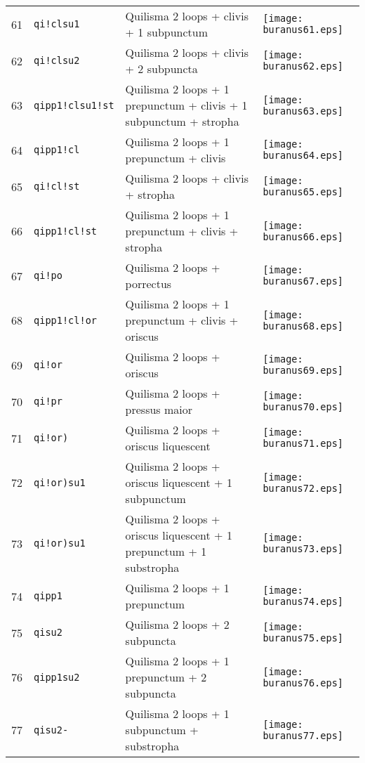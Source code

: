 \documentclass{scrarticle}
\begin{document}
\begin{longtable}{l|l|l|l}
61 & \texttt{qi!clsu1} & Quilisma 2 loops + clivis + 1 subpunctum & \texttt{[image: buranus61.eps]} \\
62 & \texttt{qi!clsu2} & Quilisma 2 loops + clivis + 2 subpuncta & \texttt{[image: buranus62.eps]} \\
63 & \texttt{qipp1!clsu1!st} & Quilisma 2 loops + 1 prepunctum + clivis + 1 subpunctum + stropha & \texttt{[image: buranus63.eps]} \\
64 & \texttt{qipp1!cl} & Quilisma 2 loops + 1 prepunctum + clivis & \texttt{[image: buranus64.eps]} \\
65 & \texttt{qi!cl!st} & Quilisma 2 loops + clivis + stropha & \texttt{[image: buranus65.eps]} \\
66 & \texttt{qipp1!cl!st} & Quilisma 2 loops + 1 prepunctum + clivis + stropha & \texttt{[image: buranus66.eps]} \\
67 & \texttt{qi!po} & Quilisma 2 loops + porrectus & \texttt{[image: buranus67.eps]} \\
68 & \texttt{qipp1!cl!or} & Quilisma 2 loops + 1 prepunctum + clivis + oriscus & \texttt{[image: buranus68.eps]} \\
69 & \texttt{qi!or} & Quilisma 2 loops + oriscus & \texttt{[image: buranus69.eps]} \\
70 & \texttt{qi!pr} & Quilisma 2 loops + pressus maior & \texttt{[image: buranus70.eps]} \\
71 & \texttt{qi!or)} & Quilisma 2 loops + oriscus liquescent & \texttt{[image: buranus71.eps]} \\
72 & \texttt{qi!or)su1} & Quilisma 2 loops + oriscus liquescent + 1 subpunctum & \texttt{[image: buranus72.eps]} \\
73 & \texttt{qi!or)su1} & Quilisma 2 loops + oriscus liquescent + 1 prepunctum + 1 substropha & \texttt{[image: buranus73.eps]} \\
74 & \texttt{qipp1} & Quilisma 2 loops + 1 prepunctum & \texttt{[image: buranus74.eps]} \\
75 & \texttt{qisu2} & Quilisma 2 loops + 2 subpuncta & \texttt{[image: buranus75.eps]} \\
76 & \texttt{qipp1su2} & Quilisma 2 loops + 1 prepunctum + 2 subpuncta & \texttt{[image: buranus76.eps]} \\
77 & \texttt{qisu2-} & Quilisma 2 loops + 1 subpunctum + substropha & \texttt{[image: buranus77.eps]} \\

\end{longtable}
\end{document}
